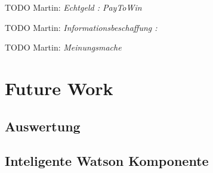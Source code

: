 \documentclass[german]{cgspaper} %
\newcommand{\todo}[1]{\textit{#1}}
\newcommand{\Martin}[1]{\textcolor{colorMartin}{TODO Martin:} \todo{#1} }
\begin{document}
\Martin{Echtgeld : PayToWin}

\Martin{Informationsbeschaffung : }

\Martin{Meinungsmache}

\section{Future Work}

\subsection{Auswertung}

\subsection{Inteligente Watson Komponente}




\end{document}

